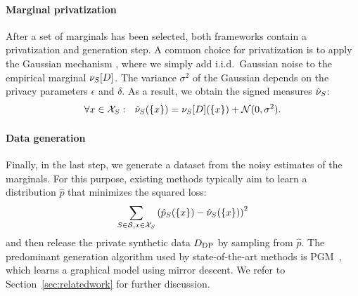 
 


\paragraph{Marginal privatization}
After a set of marginals has been selected, both frameworks contain a privatization and generation step.
A common choice for privatization is to apply the %
Gaussian mechanism \citep{mcsherry2007mechanism}, where we simply add i.i.d.~Gaussian noise to the empirical marginal $\nu_{S}[D]$. The variance $\sigma^2$ of the Gaussian depends on the privacy parameters $\epsilon$ and $\delta$. As a result, we obtain the signed measures  $\hat \nu_{S}$:
\begin{equation*}
\label{eq:gaussian}
\forall x \in \mathcal X_S:~~
\hat \nu_{S}(\{x\}) = \nu_{S}[D](\{x\}) + \mathcal N(0, \sigma^2).
\end{equation*}



\paragraph{Data generation} 
Finally, in the last step, we generate a dataset from the noisy estimates of the marginals. 
For this purpose, existing methods 
typically aim to learn a distribution $\hat{p}$ that minimizes the squared loss:
\begin{equation*}
   \sum_{S \in \mathcal S, x \in \mathcal X_S}  \left(\hat p_S(\{x\})  -  \hat \nu_{S}(\{x\})\right)^2 
\end{equation*}
and then release the private synthetic  data $D_{\text{DP}}$ by sampling from $\hat p$.
The predominant generation algorithm used by state-of-the-art methods \citep{mst, aim, cai2021data} is PGM~\citep{mckenna2019graphical}, which learns a graphical model using mirror descent. We refer to Section~\ref{sec:relatedwork} for further discussion. 


